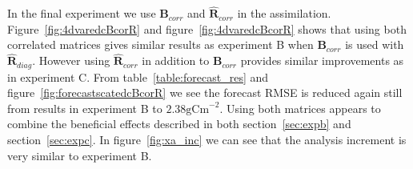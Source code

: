 \documentclass[11pt]{article}
\begin{document}
In the final experiment we use $\textbf{B}_{corr}$ and $\hat{\textbf{R}}_{corr}$ in the assimilation. Figure~\ref{fig:4dvaredcBcorR} and figure~\ref{fig:4dvaredcBcorR} shows that using both correlated matrices gives similar results as experiment B when $\textbf{B}_{corr}$ is used with $\hat{\textbf{R}}_{diag}$. However using $\hat{\textbf{R}}_{corr}$ in addition to $\textbf{B}_{corr}$ provides similar improvements as in experiment C. From table~\ref{table:forecast_res} and figure~\ref{fig:forecastscatedcBcorR} we see the forecast RMSE is reduced again still from results in experiment B to $2.38 \text{gCm}^{-2}$. Using both matrices appears to combine the beneficial effects described in both section~\ref{sec:expb} and section~\ref{sec:expc}. In figure~\ref{fig:xa_inc} we can see that the analysis increment is very similar to experiment B.
\end{document}
